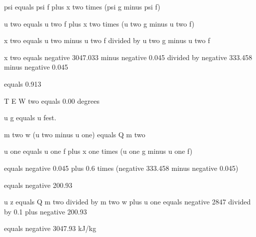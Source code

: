 psi equals psi f plus x two times (psi g minus psi f)

u two equals u two f plus x two times (u two g minus u two f)

x two equals u two minus u two f divided by u two g minus u two f

x two equals negative 3047.033 minus negative 0.045 divided by negative 333.458 minus negative 0.045

equals 0.913

T E W two equals 0.00 degrees

u g equals u fest.

m two w (u two minus u one) equals Q m two

u one equals u one f plus x one times (u one g minus u one f)

equals negative 0.045 plus 0.6 times (negative 333.458 minus negative 0.045)

equals negative 200.93

u z equals Q m two divided by m two w plus u one equals negative 2847 divided by 0.1 plus negative 200.93

equals negative 3047.93 kJ/kg